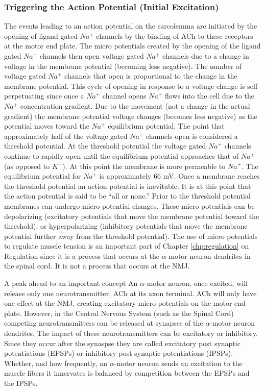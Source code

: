 \subsubsection{Triggering the Action Potential (Initial Excitation)}
The events leading to an action potential on the sarcolemma are initiated by the opening of ligand gated $Na^+$ channels by the binding of ACh to these receptors at the motor end plate. The micro potentials created by the opening of the ligand gated $Na^+$ channels then open voltage gated $Na^+$ channels due to a change in voltage in the membrane potential (becoming less negative). The number of voltage gated $Na^+$ channels that open is proportional to the change in the membrane potential. This cycle of opening in response to a voltage change is self perpetuating since once a $Na^+$ channel opens $Na^+$ flows into the cell due to the $Na^+$ concentration gradient. Due to the movement (not a change in the actual gradient) the membrane potential voltage changes (becomes less negative) as the potential moves toward the $Na^+$ equilibrium potential. The point that approximately half of the voltage gated $Na^+$ channels open is considered a threshold potential. At the threshold potential the voltage gated $Na^+$ channels continue to rapidly open until the equilibrium potential approaches that of $Na^+$ (as opposed to $K^+$). At this point the membrane is more permeable to $Na^+$. The equilibrium potential for $Na^+$ is approximately 66 mV.  Once a membrane reaches the threshold potential an action potential is inevitable. It is at this point that the action potential is said to be “all or none.” Prior to the threshold potential membranes can undergo micro potential changes. These micro potentials can be depolarizing (excitatory potentials that move the membrane potential toward the threshold), or hyperpolarizing (inhibitory potentials that move the membrane potential further away from the threshold potential). The use of micro potentials to regulate muscle tension is an important part of Chapter \ref{chp:regulation} on Regulation since it is a process that occurs at the $\alpha$-motor neuron dendrites in the spinal cord. It is not a process that occurs at the NMJ.

\begin{backgroundinformation}{A peak ahead to an important concept}
    An $\alpha$-motor neuron, once excited, will release only one neurotransmitter, ACh at its axon terminal. ACh will only have one effect at the NMJ, creating excitatory micro-potentials on the motor end plate. However, in the Central Nervous System (such as the Spinal Cord) competing neurotransmitters can be released at synapses of the $\alpha$-motor neuron dendrites. The impact of these neurotransmitters can be excitatory or inhibitory. Since they occur after the synaspse they are called excitatory post synaptic potentiations (EPSPs) or inhibitory post synaptic potentiations (IPSPs). Whether, and how frequently, an $\alpha$-motor neuron sends an excitation to the muscle fibers it innervates is balanced by competition between the EPSPs and the IPSPs.
\end{backgroundinformation}

